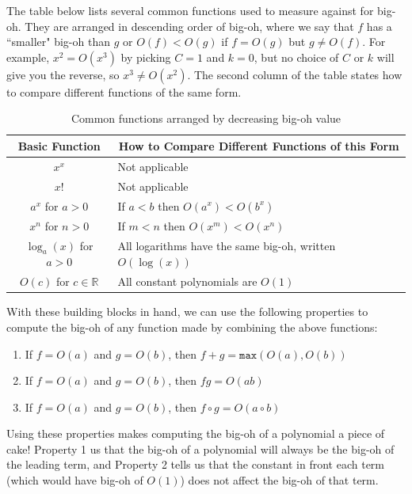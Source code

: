 \documentclass[11pt,oneside]{book}
\theoremstyle{definition}
\begin{document}
The table below lists several common functions used to measure against for big-oh.
They are arranged in descending order of big-oh, where we say that $f$ has a ``smaller" big-oh than $g$ or $O(f) < O(g)$ if $f = O(g)$ but $g \neq O(f)$.
For example, $x^{2} = O(x^{3})$ by picking $C = 1$ and $k = 0$, but no choice of $C$ or $k$ will give you the reverse, so $x^{3} \neq O(x^{2})$.
The second column of the table states how to compare different functions of the same form.

\begin{table}[H]
\centering
\begin{tabular}{|c|l|}
    \multicolumn{1}{c}{Basic Function} & \multicolumn{1}{c}{How to Compare Different Functions of this Form} \\
    \hline
    $x^{x}$ & Not applicable \\
    \hline
    $x!$ & Not applicable \\
    \hline
    $a^{x}$ for $a > 0$ & If $a < b$ then $O(a^{x}) < O(b^{x})$ \\
    \hline
    $x^{n}$ for $n > 0$ & If $m < n$ then $O(x^{m}) < O(x^{n})$ \\
    \hline
    $\log_{a}(x)$ for $a > 0$ & All logarithms have the same big-oh, written $O(\log(x))$ \\
    \hline
    $O(c)$ for $c \in \mathbb{R}$ & All constant polynomials are $O(1)$ \\
    \hline
\end{tabular}
\caption{Common functions arranged by decreasing big-oh value} \label{tab:BigOhFunctions}
\end{table}

With these building blocks in hand, we can use the following properties to compute the big-oh of any function made by combining the above functions:

\begin{enumerate}
    \item If $f = O(a)$ and $g = O(b)$, then $f + g = \texttt{max}(O(a), O(b))$

    \item If $f = O(a)$ and $g = O(b)$, then $fg = O(ab)$

    \item If $f = O(a)$ and $g = O(b)$, then $f \circ g = O(a \circ b)$
\end{enumerate}

Using these properties makes computing the big-oh of a polynomial a piece of cake!
Property 1 us that the big-oh of a polynomial will always be the big-oh of the leading term, and Property 2 tells us that the constant in front each term (which would have big-oh of $O(1)$) does not affect the big-oh of that term.
\end{document}
